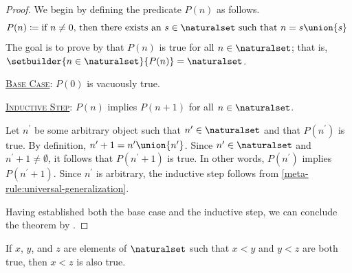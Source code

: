 \begin{proof}
    We begin by defining the predicate \( P(n) \) as follows.
    \begin{equation*}
        P(n) \coloneq \text{if \( n \neq 0 \), then there exists an \( s \in \naturalset \) such that \( n = s \union \mleft\{ s \mright\} \) }
    \end{equation*}
    The goal is to prove by  that \( P(n) \) is true for all \( n \in \naturalset \);
    that is, \( \setbuilder{n \in \naturalset}{P(n)} = \naturalset \).

    \vspace{0.3cm}
    \noindent
    \underline{\scshape Base Case}: \( P(0) \) is vacuously true.

    \vspace{0.3cm}
    \noindent
    \underline{\scshape Inductive Step}: \( P(n) \) implies \( P(n + 1) \) for all \( n \in \naturalset \).

    \vspace{0.3cm}
    \noindent
    Let \( n^{\prime} \) be some arbitrary object such that \( n^{\prime} \in \naturalset \) and that \( P(n^{\prime}) \) is true.
    By definition, \( n^{\prime} + 1 = n^{\prime} \union \mleft\{ n^{\prime} \mright\} \).
    Since \( n^{\prime} \in \naturalset \) and \( n^{\prime} + 1 \neq \emptyset \), it follows that \( P(n^{\prime} + 1) \) is true.
    In other words, \( P(n^{\prime}) \) implies \( P(n^{\prime} + 1) \).
    Since \( n^{\prime} \) is arbitrary, the inductive step follows from \cref{meta-rule:universal-generalization}.

    \vspace{0.3cm}
    \noindent
    Having established both the base case and the inductive step, we can conclude the theorem by .
\end{proof}

\begin{thm}[Transitivity]
     \label{thm:metatheory-transitivity-of-membership-relation-for-natural-numbers}
    If \( x \), \( y \), and \( z \) are elements of \( \naturalset \) such that \( x < y \) and \( y < z \) are both true,
    then \( x < z \) is also true.
\end{thm}


